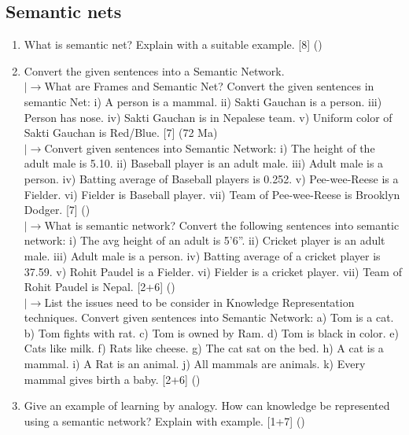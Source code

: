 \documentclass[12pt]{article}
\newcommand{\lb}{\\$\left|\rightarrow\right.$}
\begin{document}
  \subsection{Semantic nets}
    \begin{enumerate}[topsep=0pt, noitemsep]
      \item What is semantic net? Explain with a suitable example. \hfill [8] ()

      \item Convert the given sentences into a Semantic Network.
        \lb What are Frames and Semantic Net? Convert the given sentences in semantic Net: i) A person is a mammal. ii) Sakti Gauchan is a person. iii) Person has nose. iv) Sakti Gauchan is in Nepalese team. v) Uniform color of Sakti Gauchan is Red/Blue. \hfill [7] (72 Ma)
        \lb Convert given sentences into Semantic Network: i) The height of the adult male is 5.10. ii) Baseball player is an adult male. iii) Adult male is a person. iv) Batting average of Baseball players is 0.252. v) Pee-wee-Reese is a Fielder. vi) Fielder is Baseball player. vii) Team of Pee-wee-Reese is Brooklyn Dodger. \hfill [7] ()
        \lb What is semantic network? Convert the following sentences into semantic network: i) The avg height of an adult is 5'6''. ii) Cricket player is an adult male. iii) Adult male is a person. iv) Batting average of a cricket player is 37.59. v) Rohit Paudel is a Fielder. vi) Fielder is a cricket player. vii) Team of Rohit Paudel is Nepal. \hfill [2+6] ()
        \lb List the issues need to be consider in Knowledge Representation techniques. Convert given sentences into Semantic Network: a) Tom is a cat. b) Tom fights with rat. c) Tom is owned by Ram. d) Tom is black in color. e) Cats like milk. f) Rats like cheese. g) The cat sat on the bed. h) A cat is a mammal. i) A Rat is an animal. j) All mammals are animals. k) Every mammal gives birth a baby. \hfill [2+6] ()

      \item Give an example of learning by analogy. How can knowledge be represented using a semantic network? Explain with example. \hfill [1+7] ()
    \end{enumerate}
\end{document}
